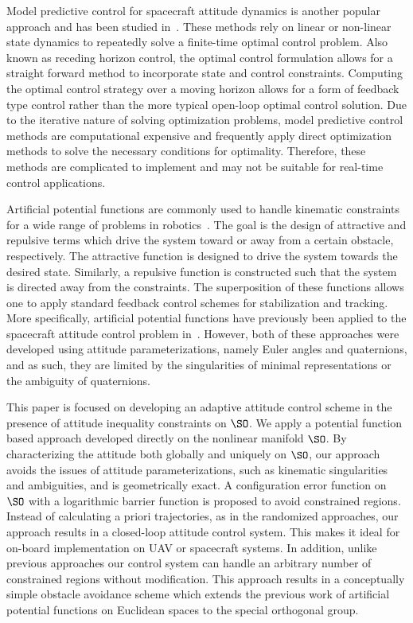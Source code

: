 Model predictive control for spacecraft attitude dynamics is another popular approach and has been studied in~\cite{guiggiani2014,kalabic2014,gupta2015}.
These methods rely on linear or non-linear state dynamics to repeatedly solve a finite-time optimal control problem.
Also known as receding horizon control, the optimal control formulation allows for a straight forward method to incorporate state and control constraints.
Computing the optimal control strategy over a moving horizon allows for a form of feedback type control rather than the more typical open-loop optimal control solution.
Due to the iterative nature of solving optimization problems, model predictive control methods are computational expensive and frequently apply direct optimization methods to solve the necessary conditions for optimality.
Therefore, these methods are complicated to implement and may not be suitable for real-time control applications.
  
Artificial potential functions are commonly used to handle kinematic constraints for a wide range of problems in robotics~\cite{rimon1992}.
The goal is the design of attractive and repulsive terms which drive the system toward or away from a certain obstacle, respectively.
The attractive function is designed to drive the system towards the desired state.
Similarly, a repulsive function is constructed such that the system is directed away from the constraints. 
The superposition of these functions allows one to apply standard feedback control schemes for stabilization and tracking.
More specifically, artificial potential functions have previously been applied to the spacecraft attitude control problem in~\cite{lee2011b,mcinnes1994}.
However, both of these approaches were developed using attitude parameterizations, namely Euler angles and quaternions, and as such, they are limited by the singularities of minimal representations or the ambiguity of quaternions.

This paper is focused on developing an adaptive attitude control scheme in the presence of attitude inequality constraints on \(\SO\).
We apply a potential function based approach developed directly on the nonlinear manifold \(\SO\). 
By characterizing the attitude both globally and uniquely on \(\SO\), our approach avoids the issues of attitude parameterizations, such as kinematic singularities and ambiguities, and is geometrically exact. 
A configuration error function on \(\SO\) with a logarithmic barrier function is proposed to avoid constrained regions. 
Instead of calculating a priori trajectories, as in the randomized approaches, our approach results in a closed-loop attitude control system. 
This makes it ideal for on-board implementation on UAV or spacecraft systems. 
In addition, unlike previous approaches our control system can handle an arbitrary number of constrained regions without modification.
This approach results in a conceptually simple obstacle avoidance scheme which extends the previous work of artificial potential functions on Euclidean spaces to the special orthogonal group.

